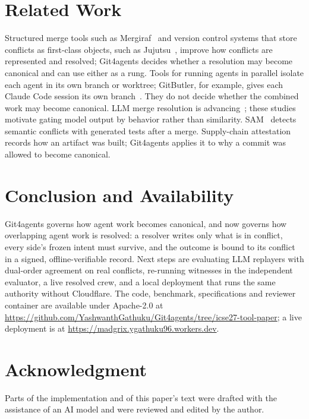 \documentclass[10pt,conference]{IEEEtran}
\newcommand{\tool}{Git4agents}
\begin{document}
\section{Related Work}
Structured merge tools such as Mergiraf~\cite{mergiraf} and version control systems that store conflicts as first-class objects, such as Jujutsu~\cite{jj-conflicts}, improve how conflicts are represented and resolved; \tool{} decides whether a resolution may become canonical and can use either as a rung. Tools for running agents in parallel isolate each agent in its own branch or worktree; GitButler, for example, gives each Claude Code session its own branch~\cite{gitbutler2025parallel}. They do not decide whether the combined work may become canonical. LLM merge resolution is advancing~\cite{schesch2026mergebench,zhang2026swegitbench,shen2026llmjudge}; these studies motivate gating model output by behavior rather than similarity. SAM~\cite{dasilva2024sam} detects semantic conflicts with generated tests after a merge. Supply-chain attestation~\cite{torresarias2019intoto,dsse} records how an artifact was built; \tool{} applies it to why a commit was allowed to become canonical.

\section{Conclusion and Availability}
\tool{} governs how agent work becomes canonical, and now governs how overlapping agent work is resolved: a resolver writes only what is in conflict, every side's frozen intent must survive, and the outcome is bound to its conflict in a signed, offline-verifiable record. Next steps are evaluating LLM replayers with dual-order agreement on real conflicts, re-running witnesses in the independent evaluator, a live resolved crew, and a local deployment that runs the same authority without Cloudflare. The code, benchmark, specifications and reviewer container are available under Apache-2.0 at \url{https://github.com/YashwanthGathuku/Git4agents/tree/icse27-tool-paper}; a live deployment is at \url{https://madgrix.ygathuku96.workers.dev}.

\section*{Acknowledgment}
Parts of the implementation and of this paper's text were drafted with the assistance of an AI model and were reviewed and edited by the author.



\end{document}
